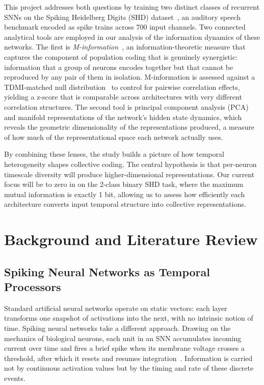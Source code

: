 \documentclass[12pt,twoside]{report}
\begin{document}
This project addresses both questions by training two distinct classes of recurrent SNNs on the 
Spiking Heidelberg Digits (SHD) dataset~\cite{cramer2022}, an auditory speech benchmark 
encoded as spike trains across 700 input channels. Two connected analytical tools are employed in 
our analysis of the information dynamics of these networks. 
The first is \emph{M-information}~\cite{liardiscalable}, an 
information-theoretic measure that captures the component of population coding that is 
genuinely synergistic: information that a group of neurons encodes together but that 
cannot be reproduced by any pair of them in isolation. M-information is assessed against a TDMI-matched
null distribution~\cite{liarinull} to control for pairwise correlation effects, yielding
a z-score that is comparable across architectures with very different correlation
structures. The second tool is principal component analysis (PCA) and manifold representations of the network's hidden
state dynamics, which reveals the geometric dimensionality of the representations
produced, a measure of how much of the representational space each network actually
uses.

By combining these lenses, the study builds a picture of how temporal heterogeneity shapes 
collective coding. The central hypothesis is that per-neuron timescale diversity will 
produce higher-dimensional representations. Our current focus will be to zero in on the 2-class binary SHD task, 
where the maximum mutual information is exactly 1 bit, allowing us to assess how efficiently each 
architecture converts input temporal structure into collective representations. 


\chapter{Background and Literature Review}
\label{chap:bg}

\section{Spiking Neural Networks as Temporal Processors}

Standard artificial neural networks operate on static vectors: each layer transforms 
one snapshot of activations into the next, with no intrinsic notion of time. Spiking 
neural networks take a different approach. Drawing on the mechanics of biological 
neurons, each unit in an SNN accumulates incoming current over time and fires a brief 
spike when its membrane voltage crosses a threshold, after which it resets and resumes 
integration~\cite{gerstner2002,maass1997}. Information is carried not by continuous 
activation values but by the timing and rate of these discrete events.
\end{document}
